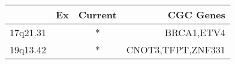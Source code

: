 \begin{tabular}{lccr}
\toprule
{} & Ex & Current &          CGC Genes \\
\midrule
17q21.31 &    &       * &         BRCA1,ETV4 \\
19q13.42 &    &       * &  CNOT3,TFPT,ZNF331 \\
\bottomrule
\end{tabular}
